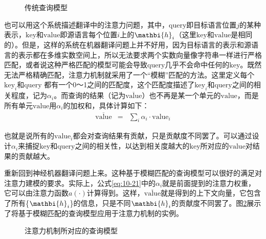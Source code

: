 \begin{figure}[htp]
\centering

\caption{传统查询模型}
\label{fig:10-22}
\end{figure}

\parinterval 也可以用这个系统描述翻译中的注意力问题，其中，$\mathrm{query}$即目标语言位置$j$的某种表示，$\mathrm{key}$和$\mathrm{value}$即源语言每个位置$i$上的${\mathbi{h}_i}$（这里$\mathrm{key}$和$\mathrm{value}$是相同的）。但是，这样的系统在机器翻译问题上并不好用，因为目标语言的表示和源语言的表示都在多维实数空间上，所以无法要求两个实数向量像字符串一样进行严格匹配，或者说这种严格匹配的模型可能会导致$\mathrm{query}$几乎不会命中任何的$\mathrm{key}$。既然无法严格精确匹配，注意力机制就采用了一个“模糊”匹配的方法。这里定义每个$\mathrm{key}_i$和$\mathrm{query}$ 都有一个0～1之间的匹配度，这个匹配度描述了$\mathrm{key}_i$和$\mathrm{query}$之间的相关程度，记为$\alpha_i$。而查询的结果（记为$\overline{\mathrm{value}}$）也不再是某一个单元的$\mathrm{value}$，而是所有单元$\mathrm{value}$用$\alpha_i$的加权和，具体计算如下：
\begin{eqnarray}
\overline{\mathrm{value}} &=& \sum_i \alpha_i \cdot {\mathrm{value}}_i
\label{eq:10-21}
\end{eqnarray}

\noindent 也就是说所有的$\mathrm{value}_i$都会对查询结果有贡献，只是贡献度不同罢了。可以通过设计$\alpha_i$来捕捉$\mathrm{key}$和$\mathrm{query}$之间的相关性，以达到相关度越大的$\mathrm{key}$所对应的$\mathrm{value}$对结果的贡献越大。

\parinterval 重新回到神经机器翻译问题上来。这种基于模糊匹配的查询模型可以很好的满足对注意力建模的要求。实际上，公式\eqref{eq:10-21}中的$\alpha_i$就是前面提到的注意力权重，它可以由注意力函数$a(\cdot)$计算得到。这样，$\overline{\mathrm{value}}$就是得到的上下文向量，它包含了所有\{$\mathbi{h}_i$\}的信息，只是不同$\mathbi{h}_i$的贡献度不同罢了。图\ref{fig:10-23}展示了将基于模糊匹配的查询模型应用于注意力机制的实例。

\begin{figure}[htp]
\centering

\caption{注意力机制所对应的查询模型}
\label{fig:10-23}
\end{figure}

